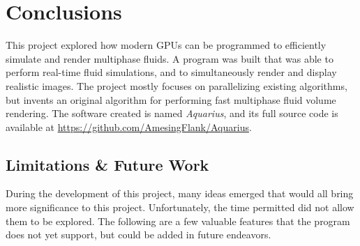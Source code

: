 \chapter{Conclusions}
\label{chapter conclusions}

This project explored how modern GPUs can be programmed to efficiently simulate and render multiphase fluids. A program was built that was able to perform real-time fluid simulations, and to simultaneously render and display realistic images. The project mostly focuses on parallelizing existing algorithms, but invents an original algorithm for performing fast multiphase fluid volume rendering. The software created is named \textit{Aquarius}, and its full source code is available at \url{https://github.com/AmesingFlank/Aquarius}.


\section{Limitations \& Future Work}
\label{section future work}

During the development of this project, many ideas emerged that would all bring more significance to this project. Unfortunately, the time permitted did not allow them to be explored. The following are a few valuable features that the program does not yet support, but could be added in future endeavors.



